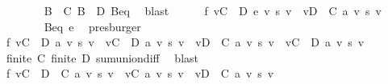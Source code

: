 \begin{isabellebody}
\ \ \ \ \ \ \isamarkupfalse%
\ {\isacartoucheopen}B\ {\isasymsubseteq}\ C{\isacartoucheclose}\ {\isacartoucheopen}B\ {\isasymsubseteq}\ D{\isacartoucheclose}\ Beq\ \isamarkupfalse%
\ blast{\isacharplus}{\kern0pt}\isanewline
\ \ \ \ \isamarkupfalse%
\ f{}{\isacharcolon}{\kern0pt}\ {\isachardoublequoteopen}{\isacharparenleft}{\kern0pt}{\isasymSum}v{\isasymin}C\ {\isasyminter}\ D{\isachardot}{\kern0pt}\ e\ v\ {\isacharasterisk}{\kern0pt}s\ v{\isacharparenright}{\kern0pt}\ {\isacharequal}{\kern0pt}\ {\isacharparenleft}{\kern0pt}{\isasymSum}v{\isasymin}D\ {\isacharminus}{\kern0pt}\ C{\isachardot}{\kern0pt}\ a\ v\ {\isacharasterisk}{\kern0pt}s\ v{\isacharparenright}{\kern0pt}{\isachardoublequoteclose}\isanewline
\ \ \ \ \ \ \isamarkupfalse%
\ Beq\ e\ \isamarkupfalse%
\ presburger\isanewline
\ \ \ \ \isamarkupfalse%
\ f{}{\isacharcolon}{\kern0pt}\ {\isachardoublequoteopen}{\isacharparenleft}{\kern0pt}{\isasymSum}v{\isasymin}C\ {\isasymunion}\ D{\isachardot}{\kern0pt}\ a\ v\ {\isacharasterisk}{\kern0pt}s\ v{\isacharparenright}{\kern0pt}\ {\isacharequal}{\kern0pt}\ {\isacharparenleft}{\kern0pt}{\isasymSum}v{\isasymin}C\ {\isacharminus}{\kern0pt}\ D{\isachardot}{\kern0pt}\ a\ v\ {\isacharasterisk}{\kern0pt}s\ v{\isacharparenright}{\kern0pt}\ {\isacharplus}{\kern0pt}\ {\isacharparenleft}{\kern0pt}{\isasymSum}v{\isasymin}D\ {\isacharminus}{\kern0pt}\ C{\isachardot}{\kern0pt}\ a\ v\ {\isacharasterisk}{\kern0pt}s\ v{\isacharparenright}{\kern0pt}\ {\isacharplus}{\kern0pt}\ {\isacharparenleft}{\kern0pt}{\isasymSum}v{\isasymin}C\ {\isasyminter}\ D{\isachardot}{\kern0pt}\ a\ v\ {\isacharasterisk}{\kern0pt}s\ v{\isacharparenright}{\kern0pt}{\isachardoublequoteclose}\isanewline
\ \ \ \ \ \ \isamarkupfalse%
\ {\isacartoucheopen}finite\ C{\isacartoucheclose}\ {\isacartoucheopen}finite\ D{\isacartoucheclose}\ sum{\isachardot}{\kern0pt}union{\isacharunderscore}{\kern0pt}diff{}\ \isamarkupfalse%
\ blast\isanewline
\ \ \ \ \isamarkupfalse%
\ f{}{\isacharcolon}{\kern0pt}\ {\isachardoublequoteopen}{\isacharparenleft}{\kern0pt}{\isasymSum}v{\isasymin}C\ {\isasymunion}\ {\isacharparenleft}{\kern0pt}D\ {\isacharminus}{\kern0pt}\ C{\isacharparenright}{\kern0pt}{\isachardot}{\kern0pt}\ a\ v\ {\isacharasterisk}{\kern0pt}s\ v{\isacharparenright}{\kern0pt}\ {\isacharequal}{\kern0pt}\ {\isacharparenleft}{\kern0pt}{\isasymSum}v{\isasymin}C{\isachardot}{\kern0pt}\ a\ v\ {\isacharasterisk}{\kern0pt}s\ v{\isacharparenright}{\kern0pt}\ {\isacharplus}{\kern0pt}\ {\isacharparenleft}{\kern0pt}{\isasymSum}v{\isasymin}D\ {\isacharminus}{\kern0pt}\ C{\isachardot}{\kern0pt}\ a\ v\ {\isacharasterisk}{\kern0pt}s\ v{\isacharparenright}{\kern0pt}{\isachardoublequoteclose}\isanewline

\end{isabellebody}
